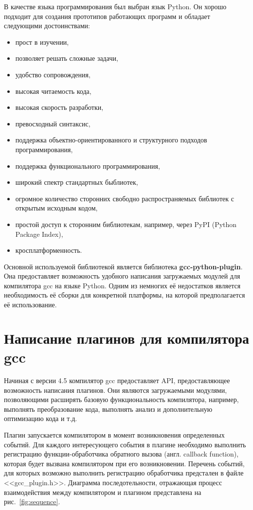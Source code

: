 В качестве языка программирования был выбран язык Python. Он хорошо подходит для создания прототипов работающих программ и обладает следующими достоинствами:
\begin{itemize}
  \item прост в изучении,
  \item позволяет решать сложные задачи,
  \item удобство сопровождения,
  \item высокая читаемость кода,
  \item высокая скорость разработки,
  \item превосходный синтаксис,
  \item поддержка объектно-ориентированного и структурного подходов программирования,
  \item поддержка функционального программирования,
  \item широкий спектр стандартных быблиотек,
  \item огромное количество сторонних свободно распространяемых библиотек с открытым исходным кодом,
  \item простой доступ к сторонним библиотекам, например, через PyPI (Python Package Index),
  \item кросплатформенность.
\end{itemize}

Основной используемой библиотекой является библиотека \textbf{gcc-python-plugin}. Она предоставляет возможность удобного написания загружаемых модулей для компилятора gcc на языке Python. Одним из немногих её недостатков является необходимость её сборки для конкретной платформы, на которой предполагается её использование.

\section{Написание плагинов для компилятора gcc}

Начиная с версии 4.5 компилятор gcc предоставляет API, предоставляющее возможность написания плагинов. Они являются загружаемыми модулями, позволяющими расширять базовую функциональность компилятора, например, выполнять преобразование кода, выполнять анализ и дополнительную оптимизацию кода и т.д.

Плагин запускается компилятором в момент возникновения определенных событий. Для каждого интересующего события в плагине необходимо выполнить регистрацию функции-обработчика обратного вызова (англ. callback function), которая будет вызвана компилятором при его возникновении. Перечень событий, для которых возможно выполнить регистрацию обработчика предстален в файле <<gcc\_plugin.h>>. Диаграмма последотельности, отражающая процесс взаимодействия между компилятором и плагином представлена на рис.~\ref{fig:sequence}.

